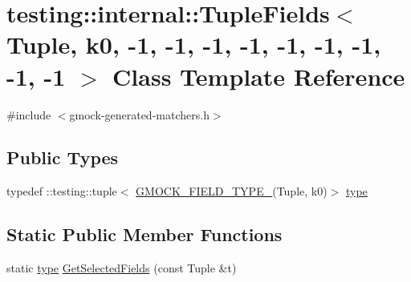 \hypertarget{classtesting_1_1internal_1_1_tuple_fields_3_01_tuple_00_01k0_00_01-1_00_01-1_00_01-1_00_01-1_00_079b3e59a7bb10f5d0d7a5843be2be9d}{}\section{testing\+:\+:internal\+:\+:Tuple\+Fields$<$ Tuple, k0, -\/1, -\/1, -\/1, -\/1, -\/1, -\/1, -\/1, -\/1, -\/1 $>$ Class Template Reference}
\label{classtesting_1_1internal_1_1_tuple_fields_3_01_tuple_00_01k0_00_01-1_00_01-1_00_01-1_00_01-1_00_079b3e59a7bb10f5d0d7a5843be2be9d}


{\ttfamily \#include $<$gmock-\/generated-\/matchers.\+h$>$}

\subsection*{Public Types}
\begin{DoxyCompactItemize}
\item 
typedef \+::testing\+::tuple$<$ \hyperlink{gmock-generated-matchers_8h_acf3e27de83a73f0d873da1cd471e505b}{G\+M\+O\+C\+K\+\_\+\+F\+I\+E\+L\+D\+\_\+\+T\+Y\+P\+E\+\_\+}(Tuple, k0)$>$ \hyperlink{classtesting_1_1internal_1_1_tuple_fields_3_01_tuple_00_01k0_00_01-1_00_01-1_00_01-1_00_01-1_00_079b3e59a7bb10f5d0d7a5843be2be9d_aeb08130cf9faa6f43e0453d2c6d9fd04}{type}
\end{DoxyCompactItemize}
\subsection*{Static Public Member Functions}
\begin{DoxyCompactItemize}
\item 
static \hyperlink{classtesting_1_1internal_1_1_tuple_fields_3_01_tuple_00_01k0_00_01-1_00_01-1_00_01-1_00_01-1_00_079b3e59a7bb10f5d0d7a5843be2be9d_aeb08130cf9faa6f43e0453d2c6d9fd04}{type} \hyperlink{classtesting_1_1internal_1_1_tuple_fields_3_01_tuple_00_01k0_00_01-1_00_01-1_00_01-1_00_01-1_00_079b3e59a7bb10f5d0d7a5843be2be9d_a98b0483efb3db67d08269b30b362a510}{Get\+Selected\+Fields} (const Tuple \&t)
\end{DoxyCompactItemize}



